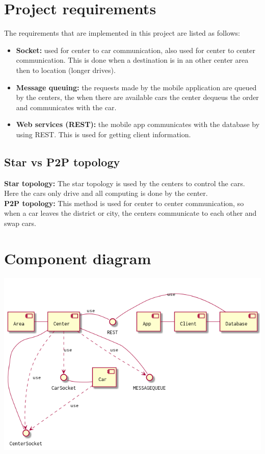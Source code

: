 \documentclass[a4paper]{article}
\begin{document}
\begin{itemize}
\end{itemize}

\section*{Project requirements}
The requirements that are implemented in this project are listed as follows:
\begin{itemize}
    \item \textbf{Socket:} used for center to car communication, also used for center to center communication. This is done when a destination is in an other center area then to location (longer drives).
    \item \textbf{Message queuing:} the requests made by the mobile application are queued by the centers, the when there are available cars the center dequeus the order and communicates with the car. 
    \item \textbf{Web services (REST):} the mobile app communicates with the database by using REST. This is used for getting client information.
\end{itemize}

\subsection*{Star vs P2P topology}
\textbf{Star topology:} The star topology is used by the centers to control the cars. Here the cars only drive and all computing is done by the center.\\
\textbf{P2P topology:} This method is used for center to center communication, so when a car leaves the district or city, the centers communicate to each other and swap cars.

\section*{Component diagram}
\includegraphics[width=1\textwidth]{../Diagrams/componentDiagram.png}
\end{document}
